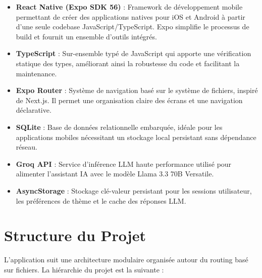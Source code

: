 \documentclass[a4paper,12pt]{report}
\begin{document}
\begin{itemize}[leftmargin=2em]
    \item \textbf{React Native (Expo SDK 56)} : Framework de d\'{e}veloppement mobile permettant de cr\'{e}er des applications natives pour iOS et Android \`{a} partir d'une seule codebase JavaScript/TypeScript. Expo simplifie le processus de build et fournit un ensemble d'outils int\'{e}gr\'{e}s.
    \item \textbf{TypeScript} : Sur-ensemble typ\'{e} de JavaScript qui apporte une v\'{e}rification statique des types, am\'{e}liorant ainsi la robustesse du code et facilitant la maintenance.
    \item \textbf{Expo Router} : Syst\`{e}me de navigation bas\'{e} sur le syst\`{e}me de fichiers, inspir\'{e} de Next.js. Il permet une organisation claire des \'{e}crans et une navigation d\'{e}clarative.
    \item \textbf{SQLite} : Base de donn\'{e}es relationnelle embarqu\'{e}e, id\'{e}ale pour les applications mobiles n\'{e}cessitant un stockage local persistant sans d\'{e}pendance r\'{e}seau.
    \item \textbf{Groq API} : Service d'inf\'{e}rence LLM haute performance utilis\'{e} pour alimenter l'assistant IA avec le mod\`{e}le Llama 3.3 70B Versatile.
    \item \textbf{AsyncStorage} : Stockage cl\'{e}-valeur persistant pour les sessions utilisateur, les pr\'{e}f\'{e}rences de th\`{e}me et le cache des r\'{e}ponses LLM.
\end{itemize}

\section{Structure du Projet}

L'application suit une architecture modulaire organis\'{e}e autour du routing bas\'{e} sur fichiers. La hi\'{e}rarchie du projet est la suivante :
\end{document}
